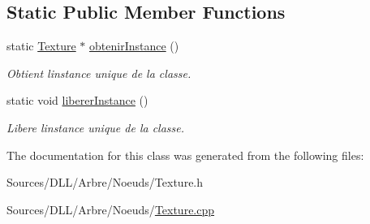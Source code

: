 \subsection*{Static Public Member Functions}
\begin{DoxyCompactItemize}
\item 
static \hyperlink{class_texture}{Texture} $\ast$ \hyperlink{group__inf2990_ga9e983f4c36a7135b480a2f72e2daa988}{obtenir\+Instance} ()
\begin{DoxyCompactList}\small\item\em Obtient l\textquotesingle{}instance unique de la classe. \end{DoxyCompactList}\item 
static void \hyperlink{group__inf2990_gaf9a59e72caaedb7e73e422de71fba261}{liberer\+Instance} ()
\begin{DoxyCompactList}\small\item\em Libere l\textquotesingle{}instance unique de la classe. \end{DoxyCompactList}\end{DoxyCompactItemize}


The documentation for this class was generated from the following files\+:\begin{DoxyCompactItemize}
\item 
Sources/\+D\+L\+L/\+Arbre/\+Noeuds/Texture.\+h\item 
Sources/\+D\+L\+L/\+Arbre/\+Noeuds/\hyperlink{_texture_8cpp}{Texture.\+cpp}\end{DoxyCompactItemize}
